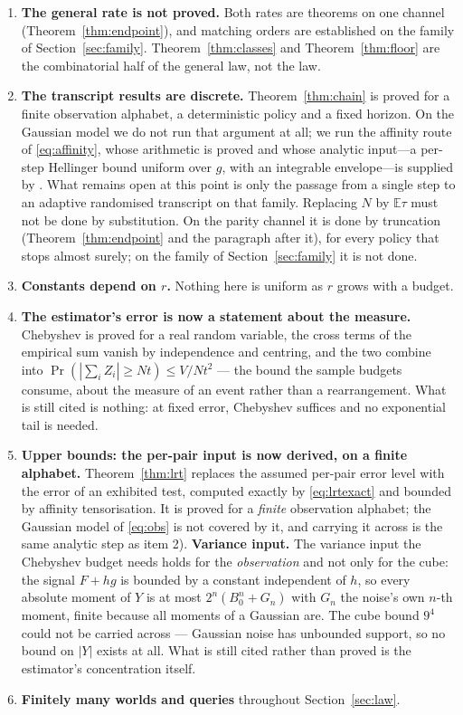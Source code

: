\begin{enumerate}
\item[1)] \textbf{The general rate is not proved.} Both rates are theorems on one channel
(Theorem~\ref{thm:endpoint}), and matching orders are established on the family of
Section~\ref{sec:family}. Theorem~\ref{thm:classes} and Theorem~\ref{thm:floor} are the
combinatorial half of the general law, not the law.
\item[2)] \textbf{The transcript results are discrete.} Theorem~\ref{thm:chain} is proved
for a finite observation alphabet, a deterministic policy and a fixed horizon. On the
Gaussian model we do not run that argument at all; we run the affinity route of
\eqref{eq:affinity}, whose arithmetic is proved and whose analytic input---a per-step
Hellinger bound uniform over $g$, with an integrable envelope---is supplied by
. What remains open at this point is only the passage from a
single step to an adaptive randomised transcript on that family. Replacing $N$ by
$\mathbb{E}\tau$ must not be done by substitution. On the parity channel it is done by
truncation (Theorem~\ref{thm:endpoint} and the paragraph after it), for every policy that
stops almost surely; on the family of Section~\ref{sec:family} it is not done.
\item[3)] \textbf{Constants depend on $r$.} Nothing here is uniform as $r$ grows with a
budget.
\item[4')] \textbf{The estimator's error is now a statement about the measure.} Chebyshev
is proved for a real random variable, the cross terms of the empirical sum vanish by
independence and centring, and the two combine into
$\Pr(|\sum_{i}Z_{i}|\ge Nt)\le V/Nt^{2}$ --- the bound the sample budgets consume, about the
measure of an event rather than a rearrangement. What is still cited is nothing: at fixed
error, Chebyshev suffices and no exponential tail is needed.
\item[4)] \textbf{Upper bounds: the per-pair input is now derived, on a finite
alphabet.} Theorem~\ref{thm:lrt} replaces the assumed per-pair error level with the error
of an exhibited test, computed exactly by \eqref{eq:lrtexact} and bounded by affinity
tensorisation. It is proved for a \emph{finite} observation alphabet; the Gaussian model of
\eqref{eq:obs} is not covered by it, and carrying it across is the same analytic step as
item 2).
\textbf{Variance input.} The variance input the Chebyshev
budget needs holds for the \emph{observation} and not only for the cube: the signal
$F+hg$ is bounded by a constant independent of $h$, so every absolute moment of $Y$ is at
most $2^{n}(B_{0}^{n}+G_{n})$ with $G_{n}$ the noise's own $n$-th moment, finite because all
moments of a Gaussian are. The cube bound $9^{4}$ could not be carried across --- Gaussian
noise has unbounded support, so no bound on $|Y|$ exists at all. What is still cited rather
than proved is the estimator's concentration itself.
\item[5)] \textbf{Finitely many worlds and queries} throughout Section~\ref{sec:law}.
\end{enumerate}


